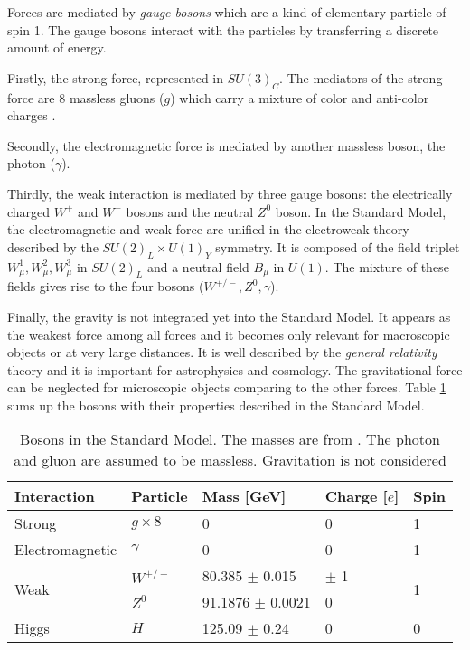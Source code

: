 Forces are mediated by \textit{gauge bosons} which are a kind of elementary particle of spin 1. The gauge bosons interact with the particles by transferring a discrete amount of energy.

Firstly, the strong force, represented in $SU(3)_{C}$. The mediators of the strong force are 8 massless gluons ($g$) which carry a mixture of color and anti-color charges \cite{Griffiths:343277}.

Secondly, the electromagnetic force is mediated by another massless boson, the photon ($\gamma$).

Thirdly, the weak interaction is mediated by three gauge bosons: the electrically charged $W^+$ and $W^-$ bosons and the neutral $Z^0$ boson. In the Standard Model, the electromagnetic and weak force are unified in the electroweak theory described by the $SU(2)_{L} \times U(1)_{Y}$ symmetry. It is composed of the field triplet $W_{\mu}^1, W_{\mu}^2, W_{\mu}^3$ in $SU(2)_{L}$ and a neutral field $B_{\mu}$ in $U(1)$. The mixture of these fields gives rise to the four bosons ($W^{+/-}, Z^0, \gamma$).

Finally, the gravity is not integrated yet into the Standard Model. It appears as the weakest force among all forces and it becomes only relevant for macroscopic objects or at very large distances. It is well described by the \textit{general relativity} theory \cite{Einstein:1905ve} and it is important for astrophysics and cosmology. The gravitational force can be neglected for microscopic objects comparing to the other forces. Table \ref{table:Bosons} sums up the bosons with their properties described in the Standard Model.

\begin{table}[htb!]
  \centering
  \caption{Bosons in the Standard Model. The masses are from \cite{Patrignani:2016xqp}. The photon and gluon are assumed to be massless. Gravitation is not considered}
  \label{table:Bosons}
  \begin{tabular}{@{}lllll@{}} \toprule
    Interaction & Particle & Mass [GeV] & Charge [$e$] & Spin\\
    \midrule
    Strong & $g \times 8$ & 0 & 0 & 1\\
    Electromagnetic & $\gamma$ & 0 & 0 & 1\\
    \multirow{2}{*}{Weak} & $W^{+/-}$ & 80.385 $\pm$ 0.015 & $\pm$ 1 & \multirow{2}{*}{1}\\
    & $Z^0$ & 91.1876 $\pm$ 0.0021 & 0 &\\
    Higgs & $H$ & 125.09 $\pm$ 0.24 & 0 & 0\\
    \bottomrule
  \end{tabular}
\end{table}

